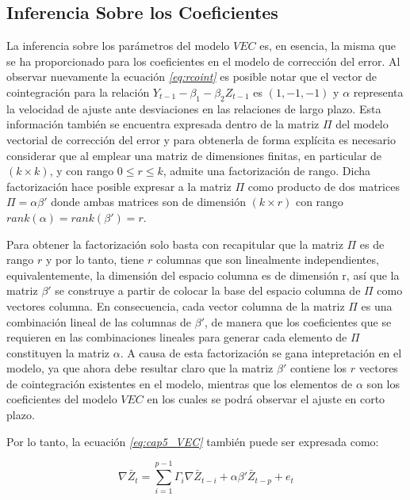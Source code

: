  \subsection{Inferencia Sobre los Coeficientes}
 


 La inferencia sobre los parámetros del modelo $VEC$ es, en esencia, la misma que se ha proporcionado para los coeficientes en el modelo de corrección del error. Al observar nuevamente la ecuación \textit{\ref{eq:rcoint}}  es posible notar que el vector de cointegración para la relación $Y_{t-1} - \beta_1 -\beta_2 Z_{t-1}$ es $(1, -1,-1)$ y $\alpha$ representa la velocidad de ajuste ante desviaciones en las relaciones de largo plazo. Esta información también se encuentra expresada dentro de la matriz $\Pi$ del modelo vectorial de corrección del error y para obtenerla de forma explícita es necesario considerar que al emplear una matriz de dimensiones finitas, en particular de $(k \times k)$, y con rango $0\leq r \leq k$, admite una factorización de rango. Dicha factorización hace posible expresar a la matriz $\Pi$ como producto de dos matrices $\Pi=\alpha\beta'$ donde ambas matrices son de dimensión $(k \times r)$ con rango $rank(\alpha)=rank(\beta')=r$.\bigskip 
 
 Para obtener la factorización solo basta con recapitular que la matriz $\Pi$ es de rango $r$ y por lo tanto, tiene $r$ columnas que son linealmente independientes, equivalentemente, la dimensión del espacio columna es de dimensión r, así que la matriz $\beta'$ se construye a partir de colocar la base del espacio columna de $\Pi$ como vectores columna. En consecuencia, cada vector columna de la matriz $\Pi$ es una combinación lineal  de las columnas de $\beta'$, de manera que los coeficientes que se requieren en las combinaciones lineales para generar cada elemento de $\Pi$ constituyen la matriz $\alpha$. A causa de esta factorización se gana intepretación en el modelo, ya que ahora debe resultar claro que la matriz $\beta'$ contiene los $r$ vectores de cointegración existentes en el modelo, mientras que los elementos de $\alpha$ son los coeficientes del modelo $VEC$ en los cuales se podrá observar el ajuste en corto plazo.\bigskip 
 
 Por lo tanto, la ecuación  \textit{\ref{eq:cap5_VEC}} también puede ser expresada como:\bigskip 
 
    \begin{equation}  \label{eq:cap5_VECcon_alpha_y_beta}
\nabla \bar{Z}_t=\sum_{i=1}^{p-1}\Gamma_i\nabla\bar{Z}_{t-i} + \alpha\beta'\bar{Z}_{t-p}+  e_t
 \end{equation}
 
